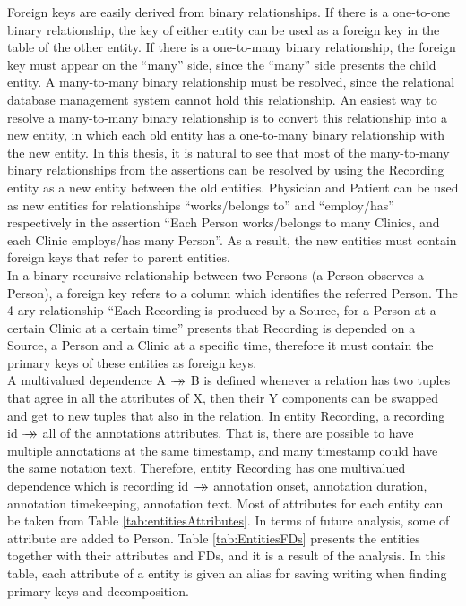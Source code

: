 Foreign keys are easily derived from binary relationships. If there is a one-to-one binary relationship, the key of either entity can be used as a foreign key in the table of the other entity. If there is a one-to-many binary relationship, the foreign key must appear on the “many” side, since the “many” side presents the child entity. A many-to-many binary relationship must be resolved, since the relational database management system cannot hold this relationship. An easiest way to resolve a many-to-many binary relationship is to convert this relationship into a new entity, in which each old entity has a one-to-many binary relationship with the new entity. In this thesis, it is natural to see that most of the many-to-many binary relationships from the assertions can be resolved by using the Recording entity as a new entity between the old entities. Physician and Patient can be used as new entities for relationships “works/belongs to” and “employ/has” respectively in the assertion “Each Person works/belongs to many Clinics, and each Clinic employs/has many Person”. As a result, the new entities must contain foreign keys that refer to parent entities.\\
In a binary recursive relationship between two Persons (a Person observes a Person), a foreign key refers to a column which identifies the referred Person. The 4-ary relationship “Each Recording is produced by a Source, for a Person at a certain Clinic at a certain time” presents that Recording is depended on a Source, a Person and a Clinic at a specific time, therefore it must contain the primary keys of these entities as foreign keys.\\
A multivalued dependence A $\rightarrow\mathrel{\mkern-14mu}\rightarrow$ B is defined whenever a relation has two tuples that agree in all the attributes of X, then their Y components can be swapped and get to new tuples that also in the relation. In entity Recording, a recording id $\rightarrow\mathrel{\mkern-14mu}\rightarrow$ all of the annotations attributes. That is, there are possible to have multiple annotations at the same timestamp, and many timestamp could have the same notation text. Therefore, entity Recording has one multivalued dependence which is recording id $\rightarrow\mathrel{\mkern-14mu}\rightarrow$ annotation onset, annotation duration, annotation timekeeping, annotation text.
Most of attributes for each entity can be taken from Table \ref{tab:entitiesAttributes}. In terms of future analysis, some of attribute are added to Person. Table \ref{tab:EntitiesFDs} presents the entities together with their attributes and FDs, and it is a result of the analysis. In this table, each attribute of a entity is given an alias for saving writing when finding primary keys and decomposition.

